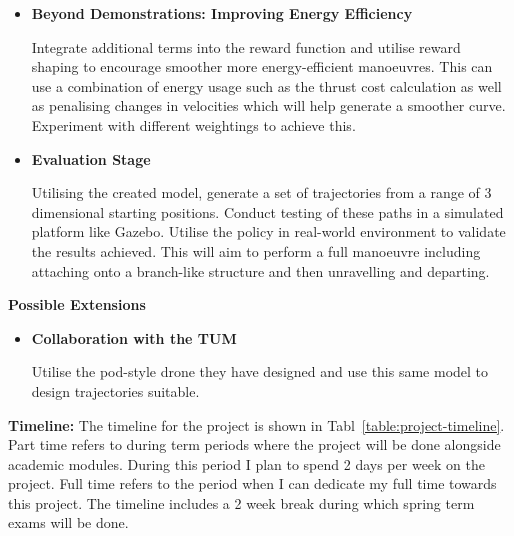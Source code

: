 \begin{itemize}
  \item \textbf{Beyond Demonstrations: Improving Energy Efficiency}
  
  Integrate additional terms into the reward function and utilise reward shaping to encourage smoother more energy-efficient manoeuvres.
  This can use a combination of energy usage such as the thrust cost calculation as well as penalising changes in velocities which will help generate a smoother curve.
  Experiment with different weightings to achieve this.

  \item \textbf{Evaluation Stage}
  
  Utilising the created model, generate a set of trajectories from a range of 3 dimensional starting positions.
  Conduct testing of these paths in a simulated platform like Gazebo.
  Utilise the policy in real-world environment to validate the results achieved.
  This will aim to perform a full manoeuvre including attaching onto a branch-like structure and then unravelling and departing.

\end{itemize}

\textbf{Possible Extensions}
\begin{itemize}
  \item \textbf{Collaboration with the TUM}
  
  Utilise the pod-style drone they have designed and use this same model to design trajectories suitable.
\end{itemize}

\textbf{Timeline:}
The timeline for the project is shown in Tabl~\ref{table:project-timeline}.
Part time refers to during term periods where the project will be done alongside academic modules.
During this period I plan to spend 2 days per week on the project.
Full time refers to the period when I can dedicate my full time towards this project.
The timeline includes a 2 week break during which spring term exams will be done.

